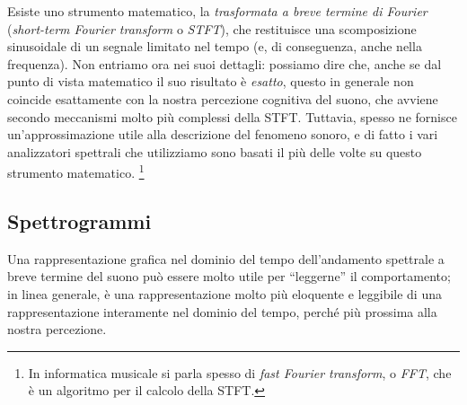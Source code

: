 \documentclass[11pt]{report}
\begin{document}
Esiste uno strumento matematico, la \emph{trasformata a breve termine di Fourier} (\emph{short-term Fourier transform} o \emph{STFT}), che restituisce una scomposizione sinusoidale di un segnale limitato nel tempo (e, di conseguenza, anche nella frequenza). Non entriamo ora nei suoi dettagli: possiamo dire che, anche se dal punto di vista matematico il suo risultato è \emph{esatto}, questo in generale non coincide esattamente con la nostra percezione cognitiva del suono, che avviene secondo meccanismi molto più complessi della STFT. Tuttavia, spesso ne fornisce un'approssimazione utile alla descrizione del fenomeno sonoro, e di fatto i vari analizzatori spettrali che utilizziamo sono basati il più delle volte su questo strumento matematico.%
\footnote{In informatica musicale si parla spesso di \emph{fast Fourier transform}, o \emph{FFT}, che è un algoritmo per il calcolo della STFT.}


\subsection{Spettrogrammi}

Una rappresentazione grafica nel dominio del tempo dell'andamento spettrale a breve termine del suono può essere molto utile per ``leggerne'' il comportamento; in linea generale, è una rappresentazione molto più eloquente e leggibile di una rappresentazione interamente nel dominio del tempo, perché più prossima alla nostra percezione. 
\end{document}

